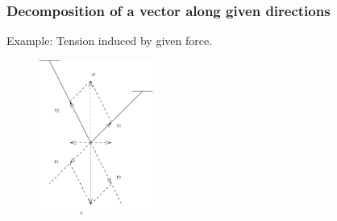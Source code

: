 \begin{frame}
  \frametitle{Decomposition of a vector along given directions}

  Example: Tension induced by given force.

\begin{figure}[h]
  \includegraphics[height=2in]{../../modules/vectors/pictures/ok-tension.eps}
  \label{fig:tension}
\end{figure}


\end{frame}